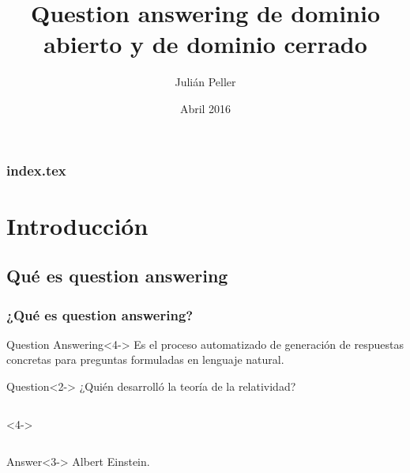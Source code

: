 \documentclass{beamer}
\title{Question answering de dominio abierto y de dominio cerrado}
\author{Julián Peller}
\date{Abril 2016} %
\begin{document}
\begin{frame}
  \titlepage
\end{frame}

\begin{frame}
  \frametitle{index.tex}
  \tableofcontents[pausesections]
\end{frame}

\section{Introducción}

\subsection{Qué es question answering}

\begin{frame}
  \frametitle{¿Qué es question answering?}
  \begin{block}{Question Answering}<4->
      Es el proceso automatizado de generación de respuestas concretas para preguntas formuladas en lenguaje natural.
  \end{block}
  \bigskip

 \begin{alertblock}{Question}<2->
      ¿Quién desarrolló la teoría de la relatividad?
  \end{alertblock}

  \begin{columns}<4->
      \begin{column}{.5\textwidth}
      \end{column}
      \begin{column}{.1\textwidth}
      \end{column}
      \begin{column}{.3\textwidth}
      \end{column}
      \begin{column}{.5\textwidth}

      \end{column}
  \end{columns}

  \begin{exampleblock}{Answer}<3->
      Albert Einstein.
  \end{exampleblock}
\end{frame}
\end{document}
